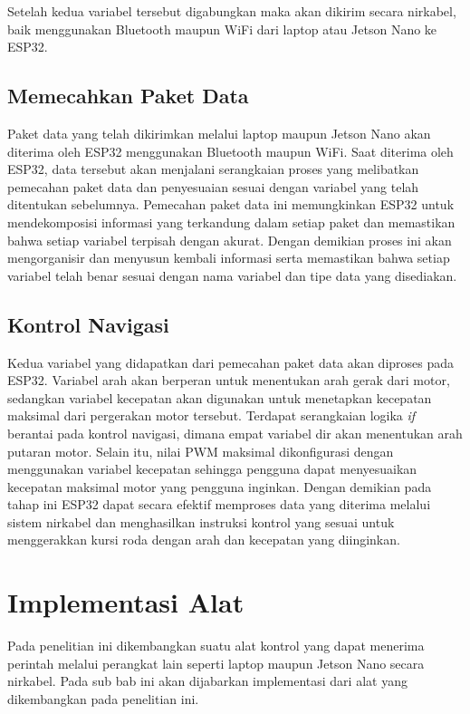 Setelah kedua variabel tersebut digabungkan maka akan dikirim secara nirkabel, baik menggunakan Bluetooth maupun WiFi dari laptop atau Jetson Nano ke ESP32.

\subsection{Memecahkan Paket Data}
Paket data yang telah dikirimkan melalui laptop maupun Jetson Nano akan diterima oleh ESP32 menggunakan Bluetooth maupun WiFi. Saat diterima oleh ESP32, data tersebut akan menjalani serangkaian proses yang melibatkan pemecahan paket data dan penyesuaian sesuai dengan variabel yang telah ditentukan sebelumnya. Pemecahan paket data ini memungkinkan ESP32 untuk mendekomposisi informasi yang terkandung dalam setiap paket dan memastikan bahwa setiap variabel terpisah dengan akurat. Dengan demikian proses ini akan mengorganisir dan menyusun kembali informasi serta memastikan bahwa setiap variabel telah benar sesuai dengan nama variabel dan tipe data yang disediakan.

\subsection{Kontrol Navigasi}
Kedua variabel yang didapatkan dari pemecahan paket data akan diproses pada ESP32. Variabel arah akan berperan untuk menentukan arah gerak dari motor, sedangkan variabel kecepatan akan digunakan untuk menetapkan kecepatan maksimal dari pergerakan motor tersebut. Terdapat serangkaian logika \emph{if} berantai pada kontrol navigasi, dimana empat variabel dir akan menentukan arah putaran motor. Selain itu, nilai PWM maksimal dikonfigurasi dengan menggunakan variabel kecepatan sehingga pengguna dapat menyesuaikan kecepatan maksimal motor yang pengguna inginkan. Dengan demikian pada tahap ini ESP32 dapat secara efektif memproses data yang diterima melalui sistem nirkabel dan menghasilkan instruksi kontrol yang sesuai untuk menggerakkan kursi roda dengan arah dan kecepatan yang diinginkan.


\section{Implementasi Alat}
\label{sec:implementasi alat}

Pada penelitian ini dikembangkan suatu alat kontrol yang dapat menerima perintah melalui perangkat lain seperti laptop maupun Jetson Nano secara nirkabel. Pada sub bab ini akan dijabarkan implementasi dari alat yang dikembangkan pada penelitian ini.

